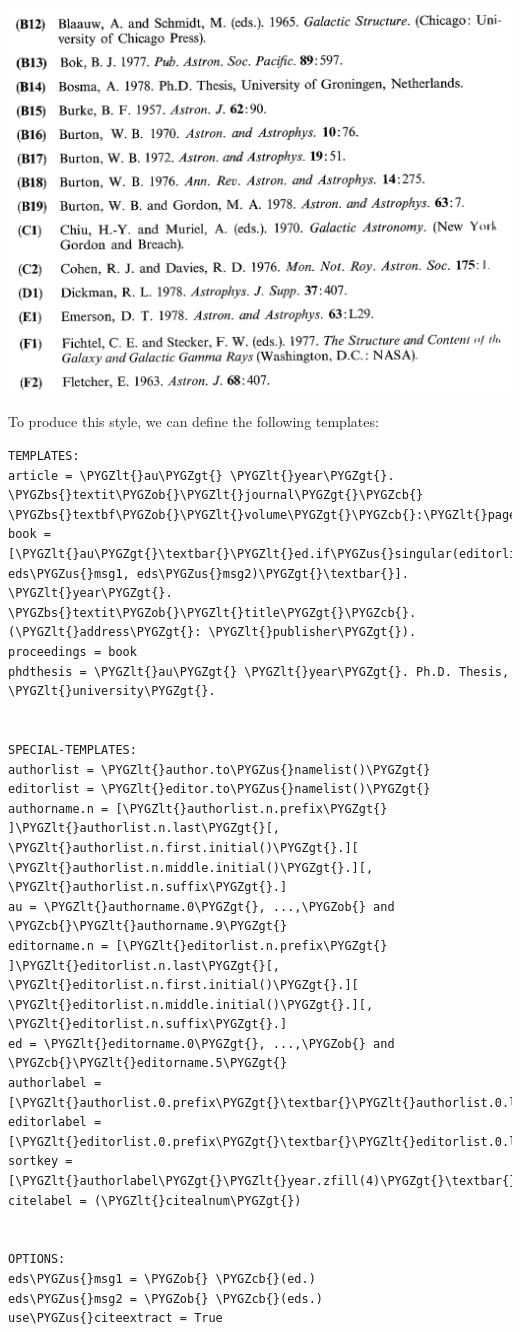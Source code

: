 \documentclass[letterpaper,10pt,english]{sphinxmanual}
\def\PYGZbs{\char`\\}
\def\PYGZus{\char`\_}
\def\PYGZob{\char`\{}
\def\PYGZcb{\char`\}}
\def\PYGZlt{\char`\<}
\def\PYGZgt{\char`\>}
\begin{document}
\includegraphics[width=0.600\linewidth]{example2a.png}

To produce this style, we can define the following templates:

\begin{Verbatim}[commandchars=\\\{\}]
TEMPLATES:
article = \PYGZlt{}au\PYGZgt{} \PYGZlt{}year\PYGZgt{}. \PYGZbs{}textit\PYGZob{}\PYGZlt{}journal\PYGZgt{}\PYGZcb{} \PYGZbs{}textbf\PYGZob{}\PYGZlt{}volume\PYGZgt{}\PYGZcb{}:\PYGZlt{}pages\PYGZgt{}.
book = [\PYGZlt{}au\PYGZgt{}\textbar{}\PYGZlt{}ed.if\PYGZus{}singular(editorlist, eds\PYGZus{}msg1, eds\PYGZus{}msg2)\PYGZgt{}\textbar{}]. \PYGZlt{}year\PYGZgt{}. \PYGZbs{}textit\PYGZob{}\PYGZlt{}title\PYGZgt{}\PYGZcb{}. (\PYGZlt{}address\PYGZgt{}: \PYGZlt{}publisher\PYGZgt{}).
proceedings = book
phdthesis = \PYGZlt{}au\PYGZgt{} \PYGZlt{}year\PYGZgt{}. Ph.D. Thesis, \PYGZlt{}university\PYGZgt{}.


SPECIAL-TEMPLATES:
authorlist = \PYGZlt{}author.to\PYGZus{}namelist()\PYGZgt{}
editorlist = \PYGZlt{}editor.to\PYGZus{}namelist()\PYGZgt{}
authorname.n = [\PYGZlt{}authorlist.n.prefix\PYGZgt{} ]\PYGZlt{}authorlist.n.last\PYGZgt{}[, \PYGZlt{}authorlist.n.first.initial()\PYGZgt{}.][ \PYGZlt{}authorlist.n.middle.initial()\PYGZgt{}.][,  \PYGZlt{}authorlist.n.suffix\PYGZgt{}.]
au = \PYGZlt{}authorname.0\PYGZgt{}, ...,\PYGZob{} and \PYGZcb{}\PYGZlt{}authorname.9\PYGZgt{}
editorname.n = [\PYGZlt{}editorlist.n.prefix\PYGZgt{} ]\PYGZlt{}editorlist.n.last\PYGZgt{}[, \PYGZlt{}editorlist.n.first.initial()\PYGZgt{}.][ \PYGZlt{}editorlist.n.middle.initial()\PYGZgt{}.][,  \PYGZlt{}editorlist.n.suffix\PYGZgt{}.]
ed = \PYGZlt{}editorname.0\PYGZgt{}, ...,\PYGZob{} and \PYGZcb{}\PYGZlt{}editorname.5\PYGZgt{}
authorlabel = [\PYGZlt{}authorlist.0.prefix\PYGZgt{}\textbar{}\PYGZlt{}authorlist.0.last\PYGZgt{}]
editorlabel = [\PYGZlt{}editorlist.0.prefix\PYGZgt{}\textbar{}\PYGZlt{}editorlist.0.last\PYGZgt{}]
sortkey = [\PYGZlt{}authorlabel\PYGZgt{}\PYGZlt{}year.zfill(4)\PYGZgt{}\textbar{}\PYGZlt{}editorlabel\PYGZgt{}\PYGZlt{}year\PYGZgt{}]
citelabel = (\PYGZlt{}citealnum\PYGZgt{})


OPTIONS:
eds\PYGZus{}msg1 = \PYGZob{} \PYGZcb{}(ed.)
eds\PYGZus{}msg2 = \PYGZob{} \PYGZcb{}(eds.)
use\PYGZus{}citeextract = True
\end{Verbatim}
\end{document}
